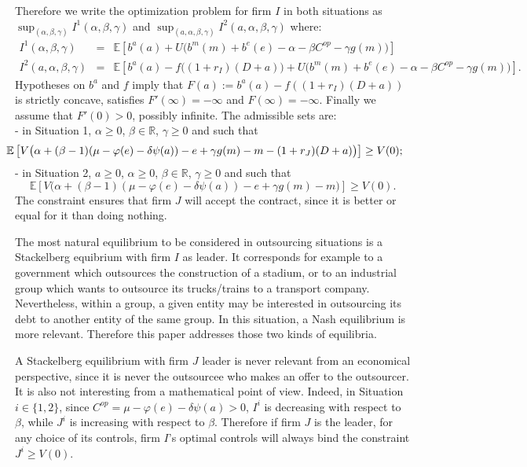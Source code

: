 \documentclass{svjour3}
\begin{document}
Therefore we write the optimization problem for firm $I$ in both situations as
$\sup_{(\alpha,\beta,\gamma)}I^1(\alpha,\beta,\gamma)$ and $\sup_{(a,\alpha,\beta,\gamma)}I^2(a,\alpha,\beta,\gamma)$ where:
\begin{eqnarray*}
I^1(\alpha,\beta,\gamma)&=&\mathbb{E}\left[b^a(a)+
U\big(b^m(m)+b^e(e)-\alpha-\beta C^{op}-\gamma g(m)\big)\right]
\\
I^2(a,\alpha,\beta,\gamma)&=&\mathbb{E}\left[b^a(a)-f\big((1+r_I)(D+a)\big)
+U\big(b^m(m)+b^e(e)-\alpha-\beta
C^{op}-\gamma g(m)\big)\right].
\end{eqnarray*}
\noindent
Hypotheses on $b^a$ and $f$ imply that $F(a):=b^a(a)-f((1+r_I)(D+a))$
is strictly concave,  satisfies $F'(\infty)=-\infty$ and $F(\infty)=-\infty$.
Finally we assume that  $F'(0)>0$, possibly infinite.
The admissible sets are:
\\
-  in Situation 1, $\alpha\geq 0$, $\beta\in\mathbb{R}$, $\gamma\geq 0$ and such that
{\small\begin{equation}
\hspace{-0.5cm} \label{admiset1}
{\mathbb{E} \left[V\big(\alpha+(\beta-1)(\mu-\varphi(e)-\delta \psi(a))- e+\gamma g(m)-m-(1+r_J)(D+a)\big)\right]\geq V(0)};
\end{equation}
}
- in Situation  2, $a\geq 0$, $\alpha\geq 0$, $\beta\in\mathbb{R}$, $\gamma\geq 0$ and such that
\begin{equation}\label{admiset2}
\mathbb{E}\left[V\big(\alpha+(\beta-1)(\mu-\varphi(e)-\delta \psi(a))-e+\gamma g(m)-m\big)\right]\geq V(0).
\end{equation}
The constraint ensures that firm $J$ will accept the contract, since it is better or equal for it than doing nothing.

\vspace{5mm}

The most natural equilibrium to be considered in outsourcing situations is a Stackelberg equibrium with firm $I$ as leader. It corresponds for example  to a government which outsources the construction of a stadium, or to an industrial group which wants to outsource its trucks/trains to a  transport company. Nevertheless, within a group,  a given entity may be interested in outsourcing its debt to another entity of the same group. In this situation,  a Nash equilibrium is more relevant.  Therefore  this paper addresses those two kinds of equilibria.  

\begin{remark}
A Stackelberg equilibrium with firm $J$ leader is never relevant from an economical perspective, since it is never the outsourcee who makes an offer to the outsourcer. It is also not interesting from a mathematical point of view. Indeed, 
in Situation $i\in\{1,2\}$, since $C^{op}=\mu-\varphi(e)-\delta\psi(a)>0$, $I^{i}$ is decreasing with respect to $\beta$, while $J^{i}$ is increasing with respect to $\beta$. Therefore if firm $J$ is the leader, for any choice of its controls, firm $I$'s optimal controls will always bind the constraint $J^{i}\geq V(0)$. 
\end{remark}
\end{document}
